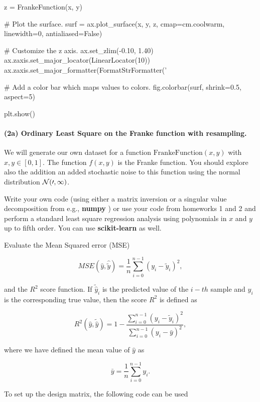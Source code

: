 \documentclass[%
oneside,                 %
final,                   %
10pt]{article}
\begin{document}
z = FrankeFunction(x, y)

# Plot the surface.
surf = ax.plot_surface(x, y, z, cmap=cm.coolwarm,
                       linewidth=0, antialiased=False)

# Customize the z axis.
ax.set_zlim(-0.10, 1.40)
ax.zaxis.set_major_locator(LinearLocator(10))
ax.zaxis.set_major_formatter(FormatStrFormatter('%

# Add a color bar which maps values to colors.
fig.colorbar(surf, shrink=0.5, aspect=5)

plt.show()


\epycod


\paragraph{(2a) Ordinary Least Square on the Franke function  with resampling.}
We will generate our own dataset for a function
$\mathrm{FrankeFunction}(x,y)$ with $x,y \in [0,1]$. The function
$f(x,y)$ is the Franke function. You should explore also the addition
an added stochastic noise to this function using the normal
distribution $\cal{N}(0,1)$.

Write your own code (using either a matrix inversion or a singular
value decomposition from e.g., \textbf{numpy} ) or use your code from
homeworks 1 and 2 and perform a standard least square regression
analysis using polynomials in $x$ and $y$ up to fifth order. You can use \textbf{scikit-learn} as well.

Evaluate the Mean Squared error (MSE)

\[ MSE(\hat{y},\hat{\tilde{y}}) = \frac{1}{n}
\sum_{i=0}^{n-1}(y_i-\tilde{y}_i)^2, 
\] 

and the $R^2$ score function.  If $\tilde{\hat{y}}_i$ is the predicted
value of the $i-th$ sample and $y_i$ is the corresponding true value,
then the score $R^2$ is defined as

\[
R^2(\hat{y}, \tilde{\hat{y}}) = 1 - \frac{\sum_{i=0}^{n - 1} (y_i - \tilde{y}_i)^2}{\sum_{i=0}^{n - 1} (y_i - \bar{y})^2},
\]

where we have defined the mean value  of $\hat{y}$ as

\[
\bar{y} =  \frac{1}{n} \sum_{i=0}^{n - 1} y_i.
\]

To set up the design matrix, the following code can be used
\end{document}
